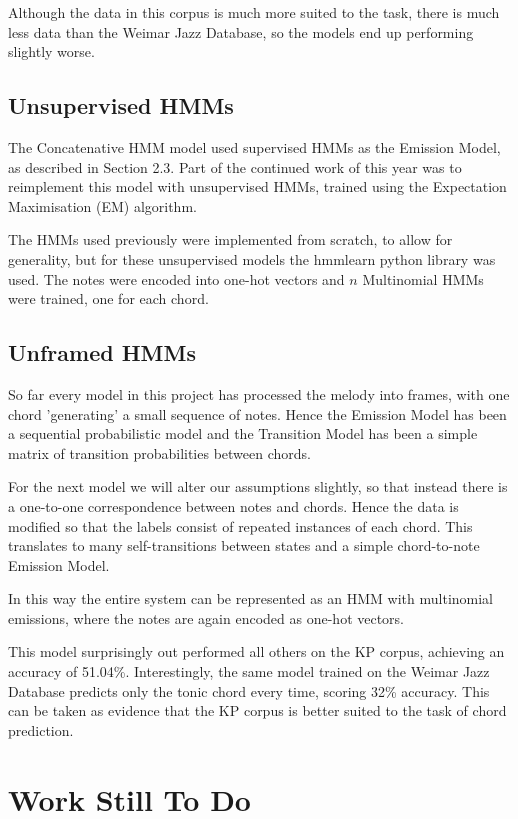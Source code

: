 \documentclass[bsc,singlespacing,logo, parskip, deptreport]{infthesis}
\begin{document}
Although the data in this corpus is much more suited to the task, there is much less data than the Weimar Jazz Database, so the models end up performing slightly worse. 
 
\subsection{Unsupervised HMMs}

The Concatenative HMM model used supervised HMMs as the Emission Model, as described in Section 2.3. Part of the continued work of this year was to reimplement this model with unsupervised HMMs, trained using the Expectation Maximisation (EM) algorithm. 

The HMMs used previously were implemented from scratch, to allow for generality, but for these unsupervised models the hmmlearn python library was used. The notes were encoded into one-hot vectors and $n$ Multinomial HMMs were trained, one for each chord.



\subsection{Unframed HMMs}

So far every model in this project has processed the melody into frames, with one chord 'generating' a small sequence of notes. Hence the Emission Model has been a sequential probabilistic model and the Transition Model has been a simple matrix of transition probabilities between chords.

For the next model we will alter our assumptions slightly, so that instead there is a one-to-one correspondence between notes and chords. Hence the data is modified so that the labels consist of repeated instances of each chord. This translates to many self-transitions between states and a simple chord-to-note Emission Model.

In this way the entire system can be represented as an HMM with multinomial emissions, where the notes are again encoded as one-hot vectors.

This model surprisingly out performed all others on the KP corpus, achieving an accuracy of 51.04\%. Interestingly, the same model trained on the Weimar Jazz Database predicts only the tonic chord every time, scoring 32\% accuracy. This can be taken as evidence that the KP corpus is better suited to the task of chord prediction. 

\section{Work Still To Do}
\end{document}
